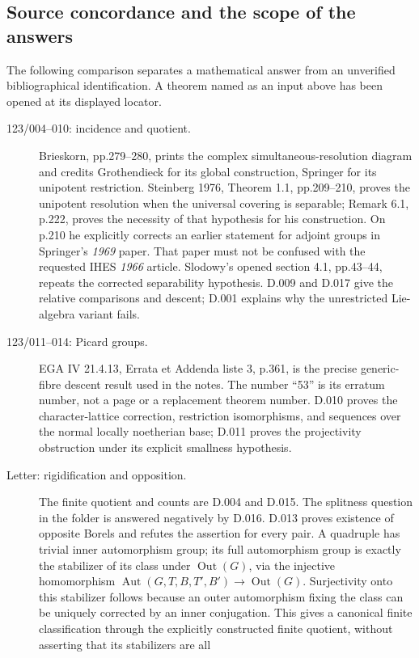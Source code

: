 \subsection{Source concordance and the scope of the answers}
The following comparison separates a mathematical answer from an
unverified bibliographical identification.  A theorem named as an
input above has been opened at its displayed locator.
\begin{description}
\item[123/004--010: incidence and quotient.] Brieskorn,
pp.279--280, prints the complex simultaneous-resolution
diagram and credits Grothendieck for its global construction,
Springer for its unipotent restriction.  Steinberg 1976,
Theorem 1.1, pp.209--210, proves the unipotent resolution
when the universal covering is separable; Remark 6.1,
p.222, proves the necessity of that hypothesis for his
construction.  On p.210 he explicitly corrects an earlier
statement for adjoint groups in Springer's \emph{1969}
paper.  That paper must not be confused with the requested
IHES \emph{1966} article.  Slodowy's opened section 4.1,
pp.43--44, repeats the corrected separability hypothesis.
D.009 and D.017 give the relative comparisons and descent;
D.001 explains why the unrestricted Lie-algebra variant fails.
\item[123/011--014: Picard groups.] EGA IV 21.4.13,
Errata et Addenda liste 3, p.361, is the precise generic-fibre
descent result used in the notes.  The number ``53'' is its
erratum number, not a page or a replacement theorem number.
D.010 proves the character-lattice correction, restriction
isomorphisms, and sequences over the normal locally noetherian
base; D.011 proves the projectivity obstruction under its
explicit smallness hypothesis.
\item[Letter: rigidification and opposition.] The finite
quotient and counts are D.004 and D.015.  The splitness
question in the folder is answered negatively by
D.016.  D.013 proves existence of opposite Borels and
refutes the assertion for every pair.  A quadruple has
trivial inner automorphism group; its full automorphism
group is exactly the stabilizer of its class under
$\operatorname{Out}(G)$, via the injective homomorphism
$\operatorname{Aut}(G,T,B,T',B')\to\operatorname{Out}(G)$.
Surjectivity onto this stabilizer follows because an outer
automorphism fixing the class can be uniquely corrected
by an inner conjugation.  This gives a canonical finite
classification through the explicitly constructed finite
quotient, without asserting that its stabilizers are all

\end{description}
